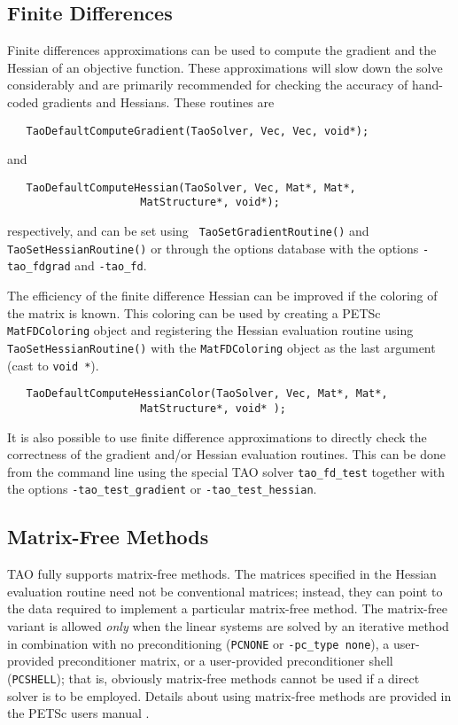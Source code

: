 \subsection{Finite Differences} 
Finite differences approximations can be used to compute the gradient and the
Hessian of an objective
function.  These approximations will slow down the solve considerably and 
are primarily  
recommended for checking the accuracy of hand-coded gradients and Hessians.
These routines are
\begin{verbatim}
   TaoDefaultComputeGradient(TaoSolver, Vec, Vec, void*);
\end{verbatim}
and 
\begin{verbatim}
   TaoDefaultComputeHessian(TaoSolver, Vec, Mat*, Mat*, 
                     MatStructure*, void*);
\end{verbatim}
respectively, and can be set using {\tt
TaoSetGradientRoutine()} and 
{\tt TaoSetHessianRoutine()} or through the options database with the
options {\tt -tao\_fdgrad} and {\tt -tao\_fd}.

The efficiency of the finite difference Hessian can be improved if the
coloring of the matrix is known.  This coloring can be used by creating a
PETSc {\tt MatFDColoring} object and registering the Hessian evaluation routine 
using
{\tt TaoSetHessianRoutine()} with the {\tt MatFDColoring} object as
the last argument (cast to {\tt void *}).
\begin{verbatim}
   TaoDefaultComputeHessianColor(TaoSolver, Vec, Mat*, Mat*, 
                     MatStructure*, void* );
\end{verbatim}

It is also possible to use finite difference approximations to directly check
the correctness of the gradient and/or Hessian evaluation routines.
This can be done from the command line using the special TAO solver 
{\tt tao\_fd\_test} together with the options
{\tt -tao\_test\_gradient} or {\tt -tao\_test\_hessian}.

\subsection{Matrix-Free Methods}
TAO fully supports matrix-free methods. The matrices specified in the
Hessian evaluation routine need not be conventional
matrices; instead, they can point to the data required to implement a
particular matrix-free method.  The matrix-free variant is allowed
{\em only} when the linear systems are solved by an iterative method
in combination with no preconditioning ({\tt PCNONE} or {\tt -pc\_type none}),
a user-provided preconditioner matrix, or a user-provided preconditioner
shell ({\tt PCSHELL}); that is,
obviously matrix-free methods cannot be used if a direct solver is to 
be employed.  %
Details about using matrix-free methods are provided in the
PETSc users manual \cite{petsc-user-ref}.



